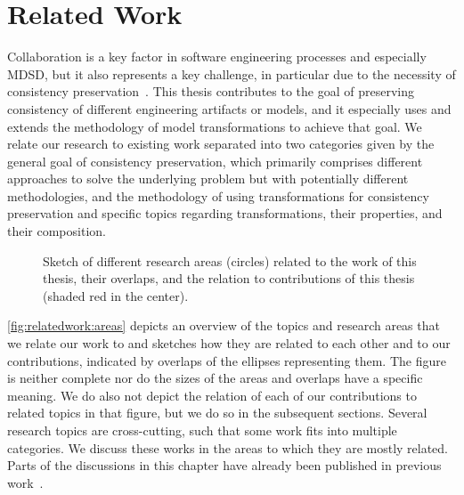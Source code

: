 \chapter{Related Work
}
\label{chap:relatedwork}

Collaboration is a key factor in software engineering processes and especially \gls{MDSD}, but it also represents a key challenge, in particular due to the necessity of consistency preservation~\cite{franzago2018mdseChallenges-TSE}.
This thesis contributes to the goal of preserving consistency of different engineering artifacts or models, and it especially uses and extends the methodology of model transformations to achieve that goal.
We relate our research to existing work separated into two categories given by the general goal of consistency preservation, which primarily comprises different approaches to solve the underlying problem but with potentially different methodologies, and the methodology of using transformations for consistency preservation and specific topics regarding transformations, their properties, and their composition.

\begin{figure}
    \centering
    
    \caption[Overlaps of related research areas]{Sketch of different research areas (circles) related to the work of this thesis, their overlaps, and the relation to contributions of this thesis (shaded red in the center).}
    \label{fig:relatedwork:areas}
\end{figure}

\autoref{fig:relatedwork:areas} depicts an overview of the topics and research areas that we relate our work to and sketches how they are related to each other and to our contributions, indicated by overlaps of the ellipses representing them.
The figure is neither complete nor do the sizes of the areas and overlaps have a specific meaning.
We do also not depict the relation of each of our contributions to related topics in that figure, but we do so in the subsequent sections.
Several research topics are cross-cutting, such that some work fits into multiple categories.
We discuss these works in the areas to which they are mostly related.
Parts of the discussions in this chapter have already been published in previous work~.


